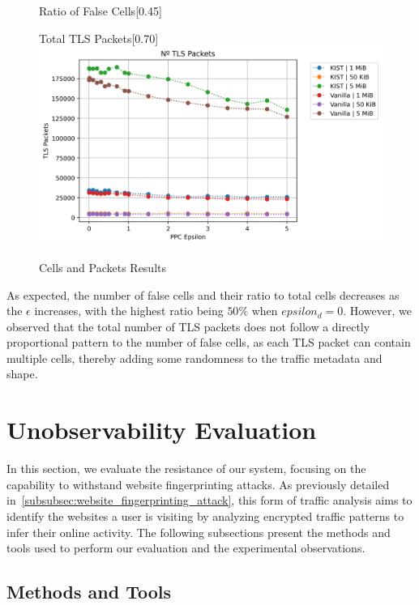 \begin{figure}[htbp]
\begin{subcaptionbox}{Ratio of False Cells\label{fig:local_dummy_ratio}}[0.45\textwidth]
    \end{subcaptionbox}
    \vfill
    \begin{subcaptionbox}{Total TLS Packets\label{fig:local_packet_count}}[0.70\textwidth]
        {\includegraphics[width=\linewidth]{Chapters/Figures/Plots/local_packet_count_5mib.png}}
    \end{subcaptionbox}
    \caption{Cells and Packets Results}\label{fig:cell_packets_results}
\end{figure}

As expected, the number of false cells and their ratio to total cells decreases as the $\epsilon$ increases, with the highest ratio being $50\%$ when $epsilon_d = 0$. However, we observed that the total number of TLS packets does not follow a directly proportional pattern to the number of false cells, as each TLS packet can contain multiple cells, thereby adding some randomness to the traffic metadata and shape. 

\section{Unobservability Evaluation}\label{sec:unobservability_evaluation}

In this section, we evaluate the resistance of our system, focusing on the capability to withstand website fingerprinting attacks. As previously detailed in~\autoref{subsubsec:website_fingerprinting_attack}, this form of traffic analysis aims to identify the websites a user is visiting by analyzing encrypted traffic patterns to infer their online activity.
The following subsections present the methods and tools used to perform our evaluation and the experimental observations.  

\subsection{Methods and Tools}\label{subsec:methods_and_tools}

